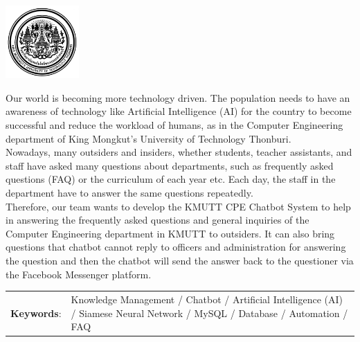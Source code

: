 \documentclass[12pt,oneside,openright,a4paper]{cpe-english-project}
\begin{document}
\pdfstringdefDisableCommands{%
\let\MakeUppercase\relax
}
\begin{center}
  \includegraphics[width=2.8cm]{./img/cover/logo02.jpg}
\end{center}
\vspace*{-1cm}

\maketitlepage
\makesignaturepage 

\abstract

Our world is becoming more technology driven. The population needs to have an awareness of technology 
like Artificial Intelligence (AI) for the country to become successful and reduce the workload of humans, as 
in the Computer Engineering department of King Mongkut’s University of Technology Thonburi. \\
Nowadays, many outsiders and insiders, whether students, teacher assistants, and staff have asked many 
questions about departments, such as frequently asked questions (FAQ) or the curriculum of each year etc. 
Each day, the staff in the department have to answer the same questions repeatedly. \\
Therefore, our team wants to develop the KMUTT CPE Chatbot System to help in answering the frequently 
asked questions and general inquiries of the Computer Engineering department in KMUTT to outsiders. It 
can also bring questions that chatbot cannot reply to officers and administration for answering the question 
and then the chatbot will send the answer back to the questioner via the Facebook Messenger platform.

\begin{flushleft}
\begin{tabular*}{\textwidth}{@{}lp{}}
\textbf{Keywords}: & Knowledge Management / Chatbot / Artificial Intelligence (AI) / Siamese Neural Network / MySQL / Database / Automation / FAQ
\end{tabular*}
\end{flushleft}
\endabstract
\end{document}
